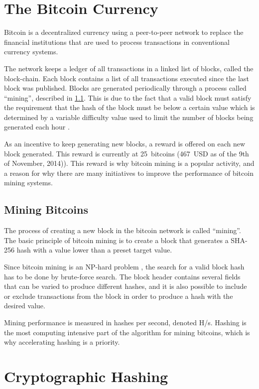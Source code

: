 \section{The Bitcoin Currency}
\label{sec:bitcoins}
Bitcoin is a decentralized currency using a peer-to-peer network to replace
the financial institutions that are used to process transactions in conventional
currency systems.

The network keeps a ledger of all transactions in a linked list of blocks, called the
block-chain. Each block contains a list of all transactions executed since the last
block was published. Blocks are generated periodically through a process
called ``mining'', described in \ref{sec:bitcoin-mining}. This is due to the fact that
a valid block must satisfy the requirement that the hash of the block must be below a certain value
which is determined by a variable difficulty value used to limit the number
of blocks being generated each hour \cite{bitcoin}.

As an incentive to keep generating new blocks, a reward is offered on each new block
generated. This reward is currently at 25~bitcoins (467~USD as of the 9th of November, 2014)).
This reward is why bitcoin mining is a popular activity, and a reason for why
there are many initiatives to improve the performance of bitcoin mining systems.

\subsection{Mining Bitcoins}
\label{sec:bitcoin-mining}
The process of creating a new block in the bitcoin network is called ``mining''. The basic
principle of bitcoin mining is to create a block that generates a SHA-256 hash with
a value lower than a preset target value.

Since bitcoin mining is an NP-hard problem \cite{bitcoin-np}, the search for a valid block
hash has to be done by brute-force search. The block header contains several fields
that can be varied to produce different hashes, and it is also possible to include
or exclude transactions from the block in order to produce a hash with the desired
value.

Mining performance is measured in hashes per second, denoted H/s. Hashing is the
most computing intensive part of the algorithm for mining bitcoins, which is
why accelerating hashing is a priority.

\section{Cryptographic Hashing}

